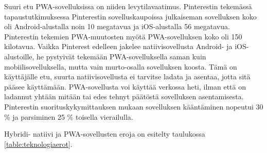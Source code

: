 \documentclass{tktltiki}
\begin{document}
Suuri etu PWA-sovelluksissa on niiden levytilavaatimus. Pinterestin tekemässä tapaustutkimuksessa \cite{Osmani} Pinterestin sovelluskaupoissa julkaiseman sovelluksen koko oli Android-alustalla noin 10 megatavua ja iOS-alustalla 56 megatavua. Pinterestin tekemien PWA-muutosten myötä PWA-sovelluksen koko oli 150 kilotavua. Vaikka Pinterest edelleen jakelee natiivisovellusta Android- ja iOS-alustoille, he pystyivät tekemään PWA-sovelluksella saman kuin mobiilisovelluksella, mutta vain murto-osalla sovelluksen koosta. Tämä on käyttäjälle etu, suurta natiivisovellusta ei tarvitse ladata ja asentaa, jotta sitä pääsee käyttämään. PWA-sovellusta voi käyttää verkossa heti, ilman että on ladannut yhtään mitään tai edes tehnyt päätöstä sovelluksen asentamisesta. Pinterestin suorituskykymittauksen mukaan \cite{Osmani} sovelluksen kääntäminen nopeutui 30 \% ja parsiminen 25 \% toisella vierailulla.

Hybridi- natiivi ja PWA-sovellusten eroja on esitelty taulukossa \ref{table:teknologiaerot}.
\end{document}
